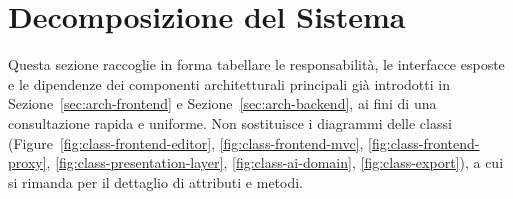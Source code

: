 \section{Decomposizione del Sistema}
\label{sec:decomposizione}
Questa sezione raccoglie in forma tabellare le responsabilità, le interfacce esposte e le dipendenze dei componenti architetturali principali già introdotti in Sezione~\ref{sec:arch-frontend} e Sezione~\ref{sec:arch-backend}, ai fini di una consultazione rapida e uniforme. Non sostituisce i diagrammi delle classi (Figure~\ref{fig:class-frontend-editor}, \ref{fig:class-frontend-mvc}, \ref{fig:class-frontend-proxy}, \ref{fig:class-presentation-layer}, \ref{fig:class-ai-domain}, \ref{fig:class-export}), a cui si rimanda per il dettaglio di attributi e metodi.

